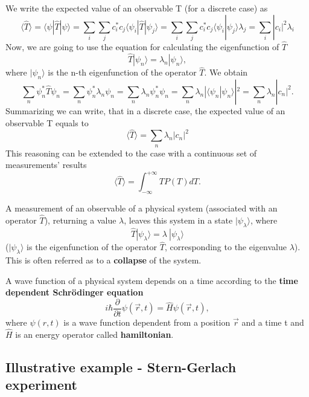 \begin{remark}
We write the expected value of an observable T (for a discrete case) as
\[ \langle \hat{T} \rangle = \langle \psi | \hat{T} | \psi \rangle = \sum_{i} \sum_{j} c_i^*c_j \langle \psi_i | \hat{T}|\psi_j\rangle = \sum_{i} \sum_{j} c_i^* c_j \langle \psi_i | \psi_j \rangle \lambda_j = \sum_{i} |c_i|^2 \lambda_i \]
Now, we are going to use the equation for calculating the eigenfunction of $\hat{T}$
\[ \hat{T} |\psi_n \rangle = \lambda_n |\psi_n \rangle, \]
where $|\psi_n \rangle$ is the n-th eigenfunction of the operator $\hat{T}$. We obtain
\[ \sum_n \psi_n^* \hat{T} \psi_n = \sum_n \psi_n^* \lambda_n \psi_n = \sum_n \lambda_n \psi_n^* \psi_n = 
\sum_n \lambda_n | \langle \psi_n | \psi_n\rangle |^2 = \sum_n \lambda_n | c_n |^2 .\]
Summarizing we can write, that in a discrete case, the expected value of an observable T equals to
\[ \boxed{\langle \hat{T} \rangle = \sum_n \lambda_n | c_n |^2} \]
This reasoning can be extended to the case with a continuous set of measurements' results
\[ \langle \hat{T} \rangle = \int_{-\infty}^{+\infty} T P(T) dT. \]
\end{remark}

\begin{postulate}
A measurement of an observable of a physical system (associated with an operator $\hat{T}$), returning a value $\lambda$, leaves this system in a state $|\psi_\lambda \rangle$, where
\[ \hat{T} |\psi_\lambda\rangle = \lambda \ |\psi_\lambda\rangle \]
($|\psi_\lambda \rangle$ is the eigenfunction of the operator $\hat{T}$, corresponding to the eigenvalue $\lambda$). This is often referred as to a \textbf{collapse} of the system.
\end{postulate}

\begin{postulate}
A wave function of a physical system depends on a time according to the \textbf{time dependent Schr\"odinger equation}
\[ i\hbar \frac{\partial}{\partial t}\psi(\vec{r}, t) = \hat{H}\psi(\vec{r}, t), \]
where $\psi(r, t)$ is a wave function dependent from a position $\vec{r}$ and a time t and $\hat{H}$ is an energy operator called \textbf{hamiltonian}.
\end{postulate}

\newpage
\subsection{Illustrative example - Stern-Gerlach experiment}

